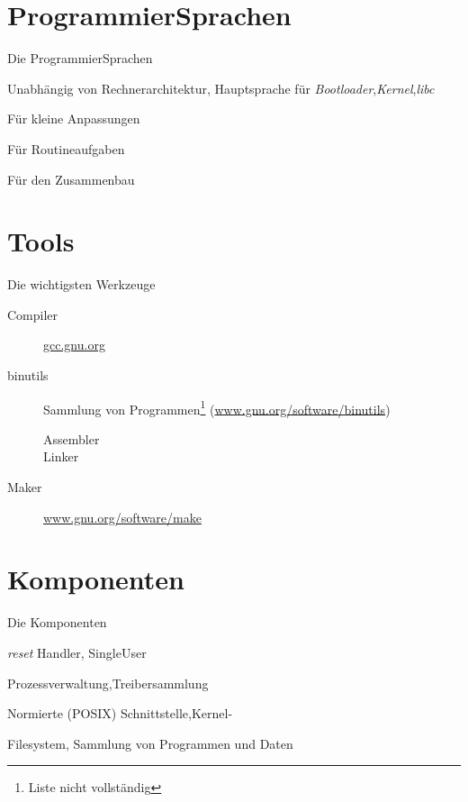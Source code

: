 \section{ProgrammierSprachen}
\begin{frame}{Die ProgrammierSprachen}
 \begin{description}[Assembler]
  \item[C] 
     Unabhängig von Rechnerarchitektur,
     Hauptsprache für {\em Bootloader},{\em Kernel},{\em libc}
  \item[Assembler] Für kleine Anpassungen
  \item[Skript] Für Routineaufgaben
  \item[Makefile] Für den Zusammenbau
 \end{description}
\end{frame}

\section{Tools}
\begin{frame}{Die wichtigsten Werkzeuge}
 \begin{description}
  \item[Compiler]   \url{gcc.gnu.org} 
  \item[binutils] Sammlung von Programmen\footnote{Liste nicht vollständig} 
     (\url{www.gnu.org/software/binutils})
 \begin{description}
  \item[Assembler]  
  \item[Linker]    
  \end{description}
  \item[Maker]  \url{www.gnu.org/software/make}
 \end{description}
\end{frame}

\section{Komponenten}
\begin{frame}{Die Komponenten}
 \begin{description}[BootLoader]
  \item[BootLoader] {\em reset} Handler, SingleUser
  \item[Kernel] Prozessverwaltung,Treibersammlung
  \item[libc] Normierte (POSIX) Schnittstelle,Kernel-\unix 
  \item[\unix] Filesystem, Sammlung von Programmen und Daten
 \end{description}
\end{frame}

